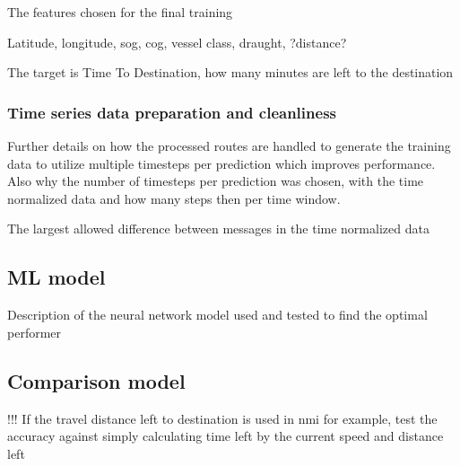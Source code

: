 \documentclass[../main.tex]{subfiles}
\begin{document}
The features chosen for the final training 

Latitude, longitude, sog, cog, vessel class, draught, ?distance? 

The target is Time To Destination, how many minutes are left to the destination


\subsubsection{Time series data preparation and cleanliness}

Further details on how the processed routes are handled to generate the training data to utilize multiple timesteps per prediction which improves performance. Also why the number of timesteps per prediction was chosen, with the time normalized data and how many steps then per time window. 

The largest allowed difference between messages in the time normalized data

\subsection{ML model}

Description of the neural network model used and tested to find the optimal performer


\subsection{Comparison model}

!!! If the travel distance left to destination is used in nmi for example, test the accuracy against simply calculating time left by the current speed and distance left 
\end{document}
